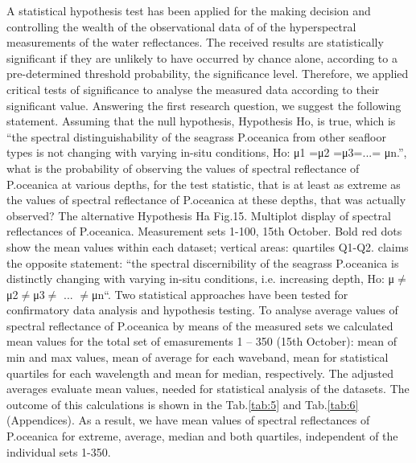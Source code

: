 \documentclass[10pt, a4paper]{article}
\begin{document}
A statistical hypothesis test has been applied for the making decision and controlling the wealth of the
observational data of of the hyperspectral measurements of the water reflectances.
The received results are statistically significant if they are unlikely to have occurred by chance alone,
according to a pre-determined threshold probability, the significance level. Therefore, we applied
critical tests of significance to analyse the measured data according to their significant value.
Answering the first research question, we suggest the following statement.
Assuming that the null hypothesis, Hypothesis Ho, is true, which is “the spectral distinguishability of
the seagrass P.oceanica from other seafloor types is not changing with varying in-situ conditions,
Ho: μ1 =μ2 =μ3=...= μn.”, what is the probability of observing the values of spectral reflectance of
P.oceanica at various depths, for the test statistic, that is at least as extreme as the values of spectral
reflectance of P.oceanica at these depths, that was actually observed? The alternative Hypothesis Ha
Fig.15. Multiplot display of spectral reflectances of P.oceanica. Measurement sets 1-100, 15th
October. Bold red dots show the mean values within each dataset; vertical areas: quartiles Q1-Q2.
claims the opposite statement: “the spectral discernibility of the seagrass P.oceanica is distinctly
changing with varying in-situ conditions, i.e. increasing depth, Ho: μ$\neq$μ2$\neq$μ3$\neq$ ... $\neq$μn“.
Two statistical approaches have been tested for confirmatory data analysis and hypothesis testing.
To analyse average values of spectral reflectance of P.oceanica by means of the measured sets we calculated 
mean values for the total set of emasurements 1 – 350 (15th October): mean of min and max values, 
mean of average for each waveband, mean for statistical quartiles for each wavelength and mean for median, respectively. 
The adjusted averages evaluate mean values, needed for statistical analysis of the datasets. 
The outcome of this calculations is shown in the Tab.\ref{tab:5} and Tab.\ref{tab:6} (Appendices). 
As a result, we have mean values of spectral reflectances of P.oceanica for extreme, average, median and both quartiles,
independent of the individual sets 1-350. 
\end{document}
